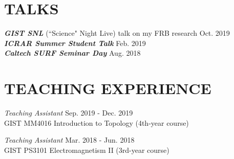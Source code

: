 \documentclass[margin, 10pt]{res} %
\begin{document}
\begin{resume}
\section{TALKS}
{\bf \sl GIST SNL} (``Science" Night Live) talk on my FRB research \hfill{Oct. 2019}\\
{\bf \sl ICRAR Summer Student Talk} \hfill{Feb. 2019}\\
{\bf \sl Caltech SURF Seminar Day} \hfill{Aug. 2018}\\


\section{TEACHING EXPERIENCE}

{\sl Teaching Assistant} \hfill Sep. 2019 - Dec. 2019 \\
GIST MM4016 Introduction to Topology (4th-year course)

{\sl Teaching Assistant} \hfill Mar. 2018 - Jun. 2018 \\
GIST PS3101 Electromagnetism II (3rd-year course)


\end{resume}
\end{document}
